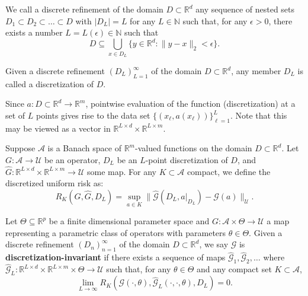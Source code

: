 \begin{definition}
We call a discrete refinement of the domain $D \subset \mathbb{R}^d$ any sequence of nested sets $D_1 \subset D_2 \subset \dots \subset D$ with $|D_L| = L$ for any $L \in \mathbb{N}$ such that, for any $\epsilon > 0$, there exists a number $L = L(\epsilon) \in \mathbb{N}$ such that
\[
D \subseteq \bigcup_{x \in D_L} \{y \in \mathbb{R}^d : \|y - x\|_2 < \epsilon\}.
\]
\end{definition}

\begin{definition}[Discretization]
Given a discrete refinement $(D_L)_{L=1}^{\infty}$ of the domain $D \subset \mathbb{R}^d$, any member $D_L$ is called a discretization of $D$.
\end{definition}

Since $a : D \subset \mathbb{R}^d \to \mathbb{R}^m$, pointwise evaluation of the function (discretization) at a set of $L$ points gives rise to the data set $\{(x_{\ell}, a(x_{\ell}))\}_{\ell=1}^L$. Note that this may be viewed as a vector in $\mathbb{R}^{L \times d} \times \mathbb{R}^{L \times m}$.

\begin{definition}
Suppose $\mathcal{A}$ is a Banach space of $\mathbb{R}^m$-valued functions on the domain $D \subset \mathbb{R}^d$. Let $G : \mathcal{A} \to \mathcal{U}$ be an operator, $D_L$ be an $L$-point discretization of $D$, and $\hat{G} : \mathbb{R}^{L \times d} \times \mathbb{R}^{L \times m} \to \mathcal{U}$ some map. For any $K \subset \mathcal{A}$ compact, we define the discretized uniform risk as:
\[
R_K(G, \hat{G}, D_L) = \sup_{a \in K} \| \hat{\mathcal{G}}(D_L, a|_{D_L}) - \mathcal{G}(a) \|_{\mathcal{U}}.
\]
\end{definition}

\begin{definition}
Let $\Theta \subseteq \mathbb{R}^p$ be a finite dimensional parameter space and $G : \mathcal{A} \times \Theta \to \mathcal{U}$ a map representing a parametric class of operators with parameters $\theta \in \Theta$. Given a discrete refinement $(D_n)_{n=1}^{\infty}$ of the domain $D \subset \mathbb{R}^d$, we say $\mathcal{G}$ is \textbf{discretization-invariant} if there exists a sequence of maps $\hat{\mathcal{G}}_1, \hat{\mathcal{G}}_2, \dots$ where $\hat{\mathcal{G}}_L : \mathbb{R}^{L \times d} \times \mathbb{R}^{L \times m} \times \Theta \to \mathcal{U}$ such that, for any $\theta \in \Theta$ and any compact set $K \subset \mathcal{A}$,
\[
\lim_{L \to \infty} R_K(\mathcal{G}(\cdot, \theta), \hat{\mathcal{G}}_L(\cdot, \cdot, \theta), D_L) = 0.
\]
\end{definition}

